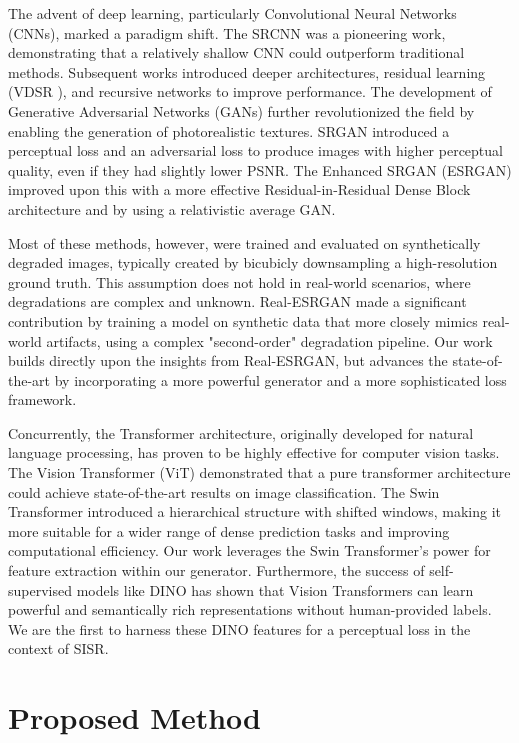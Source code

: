 \documentclass{article}
\begin{document}
The advent of deep learning, particularly Convolutional Neural Networks (CNNs), marked a paradigm shift. The SRCNN \cite{srcnn} was a pioneering work, demonstrating that a relatively shallow CNN could outperform traditional methods. Subsequent works introduced deeper architectures, residual learning (VDSR \cite{vdsr}), and recursive networks to improve performance. The development of Generative Adversarial Networks (GANs) further revolutionized the field by enabling the generation of photorealistic textures. SRGAN \cite{srgan} introduced a perceptual loss and an adversarial loss to produce images with higher perceptual quality, even if they had slightly lower PSNR. The Enhanced SRGAN (ESRGAN) \cite{esrgan} improved upon this with a more effective Residual-in-Residual Dense Block architecture and by using a relativistic average GAN.

Most of these methods, however, were trained and evaluated on synthetically degraded images, typically created by bicubicly downsampling a high-resolution ground truth. This assumption does not hold in real-world scenarios, where degradations are complex and unknown. Real-ESRGAN \cite{realesrgan} made a significant contribution by training a model on synthetic data that more closely mimics real-world artifacts, using a complex "second-order" degradation pipeline. Our work builds directly upon the insights from Real-ESRGAN, but advances the state-of-the-art by incorporating a more powerful generator and a more sophisticated loss framework.

Concurrently, the Transformer architecture, originally developed for natural language processing, has proven to be highly effective for computer vision tasks. The Vision Transformer (ViT) \cite{vit} demonstrated that a pure transformer architecture could achieve state-of-the-art results on image classification. The Swin Transformer \cite{swin} introduced a hierarchical structure with shifted windows, making it more suitable for a wider range of dense prediction tasks and improving computational efficiency. Our work leverages the Swin Transformer's power for feature extraction within our generator. Furthermore, the success of self-supervised models like DINO \cite{dino} has shown that Vision Transformers can learn powerful and semantically rich representations without human-provided labels. We are the first to harness these DINO features for a perceptual loss in the context of SISR.

\section{Proposed Method}
\end{document}
